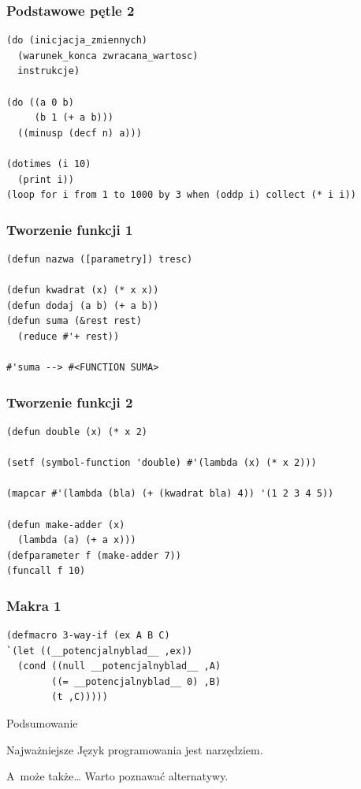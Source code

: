 \documentclass{beamer}
\begin{document}
\begin{frame}[fragile]
	\frametitle{Podstawowe pętle 2}
	{\scriptsize \begin{lstlisting}
(do (inicjacja_zmiennych)
  (warunek_konca zwracana_wartosc)
  instrukcje)

(do ((a 0 b)
     (b 1 (+ a b)))
  ((minusp (decf n) a)))

(dotimes (i 10)
  (print i))
(loop for i from 1 to 1000 by 3 when (oddp i) collect (* i i))
\end{lstlisting}}
\end{frame}

\begin{frame}[fragile]
	\frametitle{Tworzenie funkcji 1}
	{\scriptsize \begin{lstlisting}
(defun nazwa ([parametry]) tresc)

(defun kwadrat (x) (* x x))
(defun dodaj (a b) (+ a b))
(defun suma (&rest rest)
  (reduce #'+ rest))

#'suma --> #<FUNCTION SUMA>
\end{lstlisting}}
\end{frame}

\begin{frame}[fragile]
	\frametitle{Tworzenie funkcji 2}
	{\scriptsize \begin{lstlisting}
(defun double (x) (* x 2)

(setf (symbol-function 'double) #'(lambda (x) (* x 2)))

(mapcar #'(lambda (bla) (+ (kwadrat bla) 4)) '(1 2 3 4 5))

(defun make-adder (x)
  (lambda (a) (+ a x)))
(defparameter f (make-adder 7))
(funcall f 10)
\end{lstlisting}}
\end{frame}

\begin{frame}[fragile]
	\frametitle{Makra 1}
	{\scriptsize \begin{lstlisting}
(defmacro 3-way-if (ex A B C)
`(let ((__potencjalnyblad__ ,ex))
  (cond ((null __potencjalnyblad__ ,A)
        ((= __potencjalnyblad__ 0) ,B)
        (t ,C)))))
\end{lstlisting}}
\end{frame}


\begin{frame}{Podsumowanie}
	\begin{alertblock}{Najważniejsze}
		Język programowania jest narzędziem.
	\end{alertblock}
	\pause
	\begin{block}{A~może także\ldots}
		Warto poznawać alternatywy.
	\end{block}
\end{frame}
\end{document}
